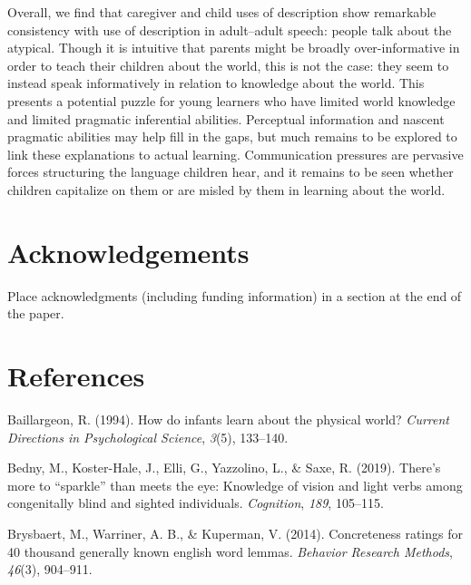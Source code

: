 \documentclass[10pt, letterpaper]{article}
\begin{document}
Overall, we find that caregiver and child uses of description show
remarkable consistency with use of description in adult--adult speech:
people talk about the atypical. Though it is intuitive that parents
might be broadly over-informative in order to teach their children about
the world, this is not the case: they seem to instead speak
informatively in relation to knowledge about the world. This presents a
potential puzzle for young learners who have limited world knowledge and
limited pragmatic inferential abilities. Perceptual information and
nascent pragmatic abilities may help fill in the gaps, but much remains
to be explored to link these explanations to actual learning.
Communication pressures are pervasive forces structuring the language
children hear, and it remains to be seen whether children capitalize on
them or are misled by them in learning about the world.

\hypertarget{acknowledgements}{%
\section{Acknowledgements}\label{acknowledgements}}

Place acknowledgments (including funding information) in a section at
the end of the paper.

\hypertarget{references}{%
\section{References}\label{references}}

\setlength{\parindent}{-0.1in} 
\setlength{\leftskip}{0.125in}

\noindent

\hypertarget{refs}{}
\leavevmode\hypertarget{ref-baillargeon1994}{}%
Baillargeon, R. (1994). How do infants learn about the physical world?
\emph{Current Directions in Psychological Science}, \emph{3}(5),
133--140.

\leavevmode\hypertarget{ref-bedny2019}{}%
Bedny, M., Koster-Hale, J., Elli, G., Yazzolino, L., \& Saxe, R. (2019).
There's more to ``sparkle'' than meets the eye: Knowledge of vision and
light verbs among congenitally blind and sighted individuals.
\emph{Cognition}, \emph{189}, 105--115.

\leavevmode\hypertarget{ref-brysbaert2014}{}%
Brysbaert, M., Warriner, A. B., \& Kuperman, V. (2014). Concreteness
ratings for 40 thousand generally known english word lemmas.
\emph{Behavior Research Methods}, \emph{46}(3), 904--911.
\end{document}

